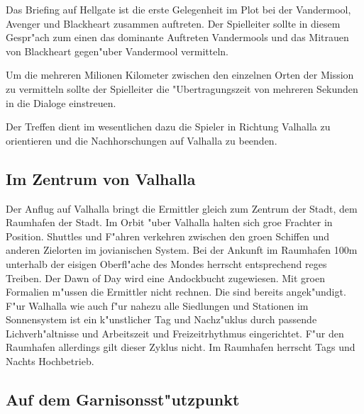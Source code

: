 \begin{remarks}
	Das Briefing auf Hellgate ist die erste Gelegenheit im Plot bei der Vandermool, Avenger und Blackheart zusammen auftreten. Der Spielleiter sollte in diesem Gespr"ach zum einen das dominante Auftreten Vandermools und das Mi\3trauen von Blackheart gegen"uber Vandermool vermitteln.

	Um die mehreren Milionen Kilometer zwischen den einzelnen Orten der Mission zu vermitteln sollte der Spielleiter die "Ubertragungszeit von mehreren Sekunden in die Dialoge einstreuen.

	Der Treffen dient im wesentlichen dazu die Spieler in Richtung Valhalla zu orientieren und die Nachhorschungen auf Valhalla zu beenden.
\end{remarks}

\subsection{Im Zentrum von Valhalla}

Der Anflug auf Valhalla bringt die Ermittler gleich zum Zentrum der Stadt, dem Raumhafen der Stadt. Im Orbit "uber Valhalla halten sich gro\3e Frachter in Position. Shuttles und F"ahren verkehren zwischen den gro\3en Schiffen und anderen Zielorten im jovianischen System. Bei der Ankunft im Raumhafen 100m unterhalb der eisigen Oberfl"ache des Mondes herrscht entsprechend reges Treiben. Der Dawn of Day wird eine Andockbucht zugewiesen. Mit gro\3en Formalien m"ussen die Ermittler nicht rechnen. Die sind bereits angek"undigt. F"ur Walhalla wie auch f"ur nahezu alle Siedlungen und Stationen im Sonnensystem ist ein k"unstlicher Tag und Nachz"uklus durch passende Lichverh"altnisse und Arbeitszeit und Freizeitrhythmus eingerichtet. F"ur den Raumhafen allerdings gilt dieser Zyklus nicht. Im Raumhafen herrscht Tags und Nachts Hochbetrieb. 

\subsection{Auf dem Garnisonsst"utzpunkt}

